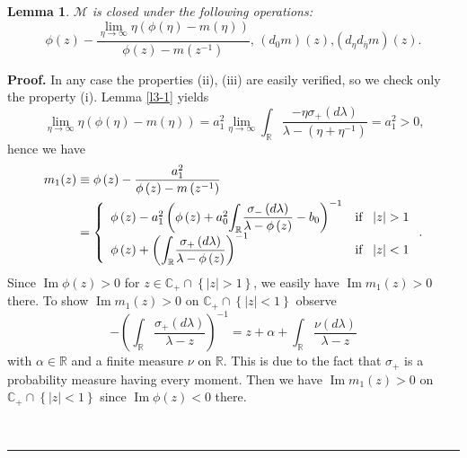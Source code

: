 \documentclass[a4paper]{article}%
\newtheorem{lemma}{Lemma}
\newenvironment{proof}[1][Proof]{\noindent\textbf{#1.} }{\ \rule{0.5em}{0.5em}}
\begin{document}
\begin{lemma}
\label{l3-2}$\mathcal{M}$ is closed under the following operations:%
\[
\phi\left(  z\right)  -\frac{\lim_{\eta\rightarrow\infty}\eta\left(
\phi\left(  \eta\right)  -m(\eta)\right)  }{\phi\left(  z\right)  -m\left(
z^{-1}\right)  }\text{, }\left(  d_{0}m\right)  \left(  z\right)  \text{,
}\left(  d_{\eta}d_{\overline{\eta}}m\right)  \left(  z\right)  \text{.}%
\]

\end{lemma}

\begin{proof}
In any case the properties (ii), (iii) are easily verified, so we check only
the property (i). Lemma \ref{l3-1} yields%
\[
\lim_{\eta\rightarrow\infty}\eta\left(  \phi\left(  \eta\right)
-m(\eta)\right)  =a_{1}^{2}\lim_{\eta\rightarrow\infty}%
{\displaystyle\int_{\mathbb{R}}}
\dfrac{-\eta\sigma_{+}\left(  d\lambda\right)  }{\lambda-\left(  \eta
+\eta^{-1}\right)  }=a_{1}^{2}>0\text{,}%
\]
hence we have%
\begin{align*}
m_{1}(z)  &  \equiv\phi\left(  z\right)  -\frac{a_{1}^{2}}{\phi\left(
z\right)  -m\left(  z^{-1}\right)  }\\
&  =\left\{
\begin{array}
[c]{ll}%
\phi\left(  z\right)  -a_{1}^{2}\left(  \phi\left(  z\right)  +a_{0}^{2}%
{\displaystyle\int_{\mathbb{R}}}
\dfrac{\sigma_{-}\left(  d\lambda\right)  }{\lambda-\phi\left(  z\right)
}-b_{0}\right)  ^{-1} & \text{if \ }\left\vert z\right\vert >1\\
\phi\left(  z\right)  +\left(
{\displaystyle\int_{\mathbb{R}}}
\dfrac{\sigma_{+}\left(  d\lambda\right)  }{\lambda-\phi\left(  z\right)
}\right)  ^{-1} & \text{if \ }\left\vert z\right\vert <1
\end{array}
\right.  \text{.}%
\end{align*}
Since $\operatorname{Im}\phi\left(  z\right)  >0$ for $z\in\mathbb{C}_{+}%
\cap\left\{  \left\vert z\right\vert >1\right\}  $, we easily have
$\operatorname{Im}m_{1}(z)>0$ there. To show $\operatorname{Im}m_{1}(z)>0$ on
$\mathbb{C}_{+}\cap\left\{  \left\vert z\right\vert <1\right\}  $ observe
\[
-\left(
{\displaystyle\int_{\mathbb{R}}}
\dfrac{\sigma_{+}\left(  d\lambda\right)  }{\lambda-z}\right)  ^{-1}=z+\alpha+%
{\displaystyle\int_{\mathbb{R}}}
\dfrac{\nu\left(  d\lambda\right)  }{\lambda-z}%
\]
with $\alpha\in\mathbb{R}$ and a finite measure $\nu$ on $\mathbb{R}$. This is
due to the fact that $\sigma_{+}$ is a probability measure having every
moment. Then we have $\operatorname{Im}m_{1}(z)>0$ on $\mathbb{C}_{+}%
\cap\left\{  \left\vert z\right\vert <1\right\}  $ since $\operatorname{Im}%
\phi\left(  z\right)  <0$ there.


\end{proof}
\end{document}
